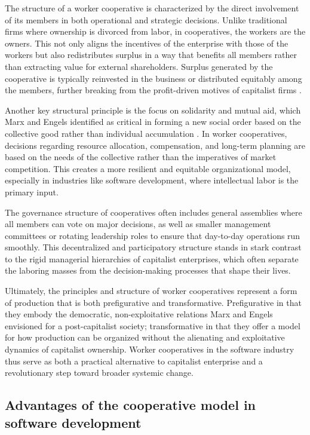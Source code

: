 \begin{refsection}
The structure of a worker cooperative is characterized by the direct involvement of its members in both operational and strategic decisions. Unlike traditional firms where ownership is divorced from labor, in cooperatives, the workers are the owners. This not only aligns the incentives of the enterprise with those of the workers but also redistributes surplus in a way that benefits all members rather than extracting value for external shareholders. Surplus generated by the cooperative is typically reinvested in the business or distributed equitably among the members, further breaking from the profit-driven motives of capitalist firms \cite[pp.~89-91]{wright2010}.

Another key structural principle is the focus on solidarity and mutual aid, which Marx and Engels identified as critical in forming a new social order based on the collective good rather than individual accumulation \cite[pp.~73-75]{marx1864}. In worker cooperatives, decisions regarding resource allocation, compensation, and long-term planning are based on the needs of the collective rather than the imperatives of market competition. This creates a more resilient and equitable organizational model, especially in industries like software development, where intellectual labor is the primary input.

The governance structure of cooperatives often includes general assemblies where all members can vote on major decisions, as well as smaller management committees or rotating leadership roles to ensure that day-to-day operations run smoothly. This decentralized and participatory structure stands in stark contrast to the rigid managerial hierarchies of capitalist enterprises, which often separate the laboring masses from the decision-making processes that shape their lives.

Ultimately, the principles and structure of worker cooperatives represent a form of production that is both prefigurative and transformative. Prefigurative in that they embody the democratic, non-exploitative relations Marx and Engels envisioned for a post-capitalist society; transformative in that they offer a model for how production can be organized without the alienating and exploitative dynamics of capitalist ownership. Worker cooperatives in the software industry thus serve as both a practical alternative to capitalist enterprise and a revolutionary step toward broader systemic change.

\subsection{Advantages of the cooperative model in software development}


\end{refsection}
